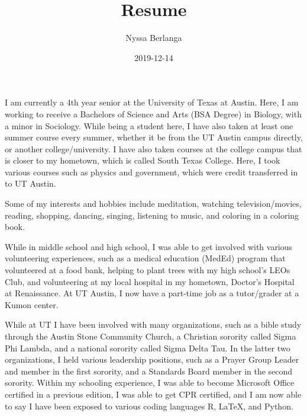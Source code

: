\documentclass[]{article}
\title{Resume}
\author{Nyssa Berlanga}
\date{2019-12-14}
\begin{document}
\maketitle

I am currently a 4th year senior at the University of Texas at Austin.
Here, I am working to receive a Bachelors of Science and Arts (BSA
Degree) in Biology, with a minor in Sociology. While being a student
here, I have also taken at least one summer course every summer, whether
it be from the UT Austin campus directly, or another college/university.
I have also taken courses at the college campus that is closer to my
hometown, which is called South Texas College. Here, I took various
courses such as physics and government, which were credit transferred in
to UT Austin.

Some of my interests and hobbies include meditation, watching
television/movies, reading, shopping, dancing, singing, listening to
music, and coloring in a coloring book.

While in middle school and high school, I was able to get involved with
various volunteering experiences, such as a medical education (MedEd)
program that volunteered at a food bank, helping to plant trees with my
high school's LEOs Club, and volunteering at my local hospital in my
hometown, Doctor's Hospital at Renaissance. At UT Austin, I now have a
part-time job as a tutor/grader at a Kumon center.

While at UT I have been involved with many organizations, such as a
bible study through the Austin Stone Community Church, a Christian
sorority called Sigma Phi Lambda, and a national sorority called Sigma
Delta Tau. In the latter two organizations, I held various leadership
positions, such as a Prayer Group Leader and member in the first
sorority, and a Standards Board member in the second sorority. Within my
schooling experience, I was able to become Microsoft Office certified in
a previous edition, I was able to get CPR certified, and I am now able
to say I have been exposed to various coding languages R, LaTeX, and
Python.
\end{document}
